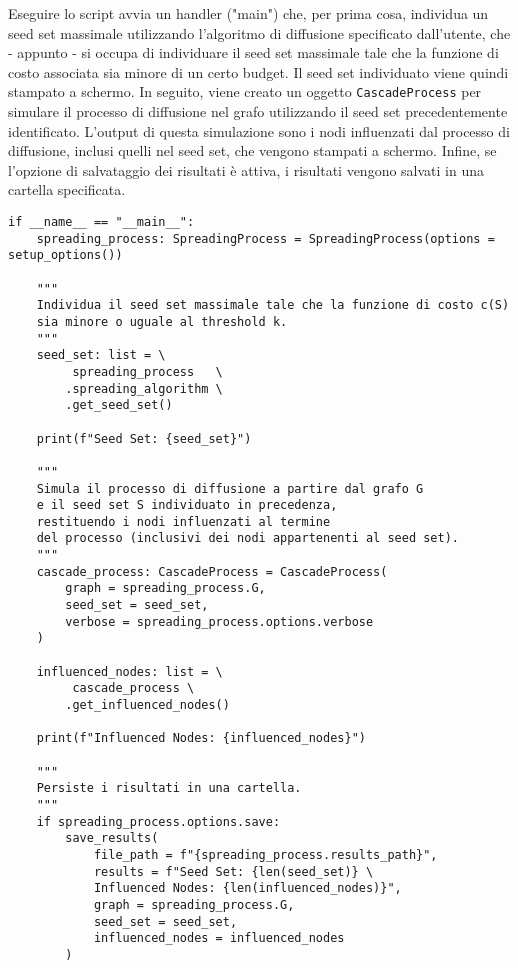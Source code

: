 Eseguire lo script avvia un handler ("main") che, per prima cosa, individua un seed set massimale utilizzando l'algoritmo di diffusione specificato dall'utente, che - appunto - si occupa di individuare il seed set massimale tale che la funzione di costo associata sia minore di un certo budget. Il seed set individuato viene quindi stampato a schermo. In seguito, viene creato un oggetto \texttt{CascadeProcess} per simulare il processo di diffusione nel grafo utilizzando il seed set precedentemente identificato. L'output di questa simulazione sono i nodi influenzati dal processo di diffusione, inclusi quelli nel seed set, che vengono stampati a schermo. Infine, se l'opzione di salvataggio dei risultati è attiva, i risultati vengono salvati in una cartella specificata.

\begin{code}
\begin{verbatim}
if __name__ == "__main__": 
    spreading_process: SpreadingProcess = SpreadingProcess(options = setup_options())

    """
    Individua il seed set massimale tale che la funzione di costo c(S) 
    sia minore o uguale al threshold k.
    """
    seed_set: list = \
         spreading_process   \
        .spreading_algorithm \
        .get_seed_set()
    
    print(f"Seed Set: {seed_set}")

    """
    Simula il processo di diffusione a partire dal grafo G 
    e il seed set S individuato in precedenza,
    restituendo i nodi influenzati al termine 
    del processo (inclusivi dei nodi appartenenti al seed set).
    """
    cascade_process: CascadeProcess = CascadeProcess(
        graph = spreading_process.G, 
        seed_set = seed_set,
        verbose = spreading_process.options.verbose
    )

    influenced_nodes: list = \
         cascade_process \
        .get_influenced_nodes()

    print(f"Influenced Nodes: {influenced_nodes}")

    """
    Persiste i risultati in una cartella.
    """
    if spreading_process.options.save:
        save_results(
            file_path = f"{spreading_process.results_path}",
            results = f"Seed Set: {len(seed_set)} \ 
            Influenced Nodes: {len(influenced_nodes)}",
            graph = spreading_process.G,
            seed_set = seed_set,
            influenced_nodes = influenced_nodes
        )
\end{verbatim}
\end{code}


